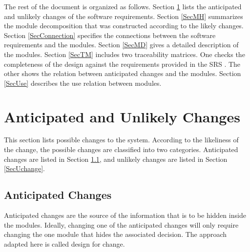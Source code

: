 \documentclass[12pt, titlepage]{article}
\begin{document}
The rest of the document is organized as follows. Section
\ref{SecChange} lists the anticipated and unlikely changes of the software
requirements. Section \ref{SecMH} summarizes the module decomposition that
was constructed according to the likely changes. Section \ref{SecConnection}
specifies the connections between the software requirements and the
modules. Section \ref{SecMD} gives a detailed description of the
modules. Section \ref{SecTM} includes two traceability matrices. One checks
the completeness of the design against the requirements provided in the SRS \cite{SRS}. The
other shows the relation between anticipated changes and the modules. Section
\ref{SecUse} describes the use relation between modules.

\section{Anticipated and Unlikely Changes} \label{SecChange}

This section lists possible changes to the system. According to the likeliness
of the change, the possible changes are classified into two
categories. Anticipated changes are listed in Section \ref{SecAchange}, and
unlikely changes are listed in Section \ref{SecUchange}.

\subsection{Anticipated Changes} \label{SecAchange}

Anticipated changes are the source of the information that is to be hidden
inside the modules. Ideally, changing one of the anticipated changes will only
require changing the one module that hides the associated decision. The approach
adapted here is called design for
change.
\end{document}
